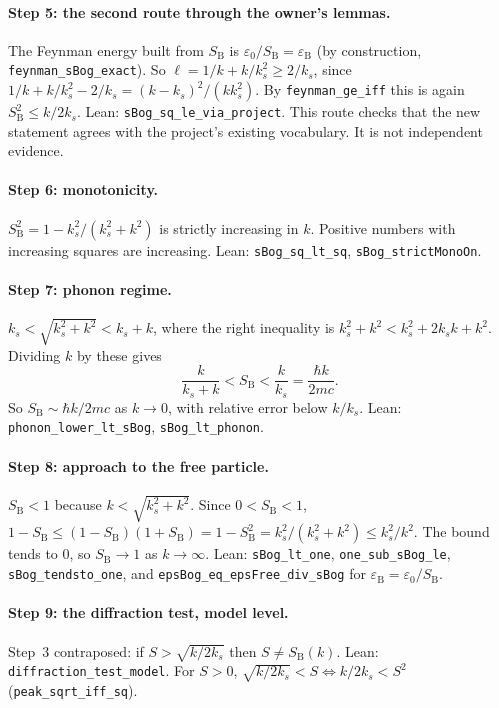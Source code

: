 \documentclass[11pt]{article}
\theoremstyle{remark}
\newcommand{\lean}[1]{\texttt{#1}}
\newcommand{\ks}{k_s}
\newcommand{\SB}{S_{\mathrm B}}
\newcommand{\eB}{\varepsilon_{\mathrm B}}
\begin{document}
\paragraph{Step 5: the second route through the owner's lemmas.} The Feynman energy built from $\SB$ is
$\varepsilon_0/\SB=\eB$ (by construction, \lean{feynman\_sBog\_exact}). So
$\ell=1/k+k/\ks^2\ge 2/\ks$, since $1/k+k/\ks^2-2/\ks=(k-\ks)^2/(k\ks^2)$. By \lean{feynman\_ge\_iff} this is
again $\SB^2\le k/2\ks$. Lean: \lean{sBog\_sq\_le\_via\_project}. This route checks that the new statement agrees with
the project's existing vocabulary. It is not independent evidence.

\paragraph{Step 6: monotonicity.} $\SB^2=1-\ks^2/(\ks^2+k^2)$ is strictly increasing in $k$. Positive numbers
with increasing squares are increasing. Lean: \lean{sBog\_sq\_lt\_sq}, \lean{sBog\_strictMonoOn}.

\paragraph{Step 7: phonon regime.} $\ks<\sqrt{\ks^2+k^2}<\ks+k$, where the right inequality is
$\ks^2+k^2<\ks^2+2\ks k+k^2$. Dividing $k$ by these gives
\[
\frac{k}{\ks+k}<\SB<\frac{k}{\ks}=\frac{\hbar k}{2mc}.
\]
So $\SB\sim\hbar k/2mc$ as $k\to0$, with relative error below $k/\ks$. Lean: \lean{phonon\_lower\_lt\_sBog},
\lean{sBog\_lt\_phonon}.

\paragraph{Step 8: approach to the free particle.} $\SB<1$ because $k<\sqrt{\ks^2+k^2}$. Since $0<\SB<1$,
$1-\SB\le(1-\SB)(1+\SB)=1-\SB^2=\ks^2/(\ks^2+k^2)\le\ks^2/k^2$. The bound tends to 0, so $\SB\to1$ as $k\to\infty$.
Lean: \lean{sBog\_lt\_one}, \lean{one\_sub\_sBog\_le}, \lean{sBog\_tendsto\_one}, and \lean{epsBog\_eq\_epsFree\_div\_sBog}
for $\eB=\varepsilon_0/\SB$.

\paragraph{Step 9: the diffraction test, model level.} Step~3 contraposed: if $S>\sqrt{k/2\ks}$ then $S\ne\SB(k)$.
Lean: \lean{diffraction\_test\_model}. For $S>0$, $\sqrt{k/2\ks}<S\iff k/2\ks<S^2$ (\lean{peak\_sqrt\_iff\_sq}).
\end{document}
